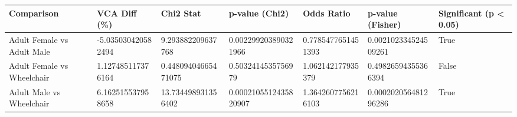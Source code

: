 \begin{tabular}{lllllll}
\hline
Comparison & VCA Diff (\%) & Chi2 Stat & p-value (Chi2) & Odds Ratio & p-value (Fisher) & Significant (p < 0.05) \\ \hline
Adult Female vs Adult Male & -5.035030420582494 & 9.293882209637768 & 0.002299203890321966 & 0.7785477651451393 & 0.002102334524509261 & True \\
Adult Female vs Wheelchair & 1.127485117376164 & 0.44809404665471075 & 0.5032414535756979 & 1.062142177935379 & 0.49826594355366394 & False \\
Adult Male vs Wheelchair & 6.162515537958658 & 13.734498931356402 & 0.0002105512435820907 & 1.3642607756216103 & 0.000202056481296286 & True \\
\hline
\end{tabular}
